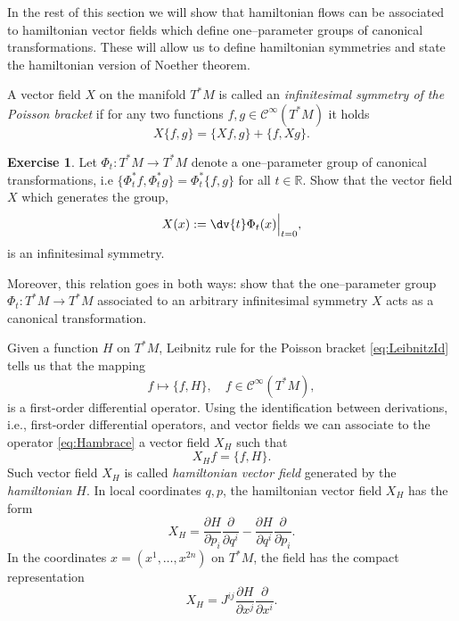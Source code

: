 \documentclass[english,fontsize=11pt,paper=b5]{scrbook}
\numberwithin{equation}{chapter}
\theoremstyle{definition}
\newtheorem{exercise}{Exercise}[chapter]
\begin{document}
    In the rest of this section we will show that hamiltonian flows can be associated to hamiltonian vector fields which define one--parameter groups of canonical transformations. These will allow us to define hamiltonian symmetries and state the hamiltonian version of Noether theorem.

    \begin{tcolorbox}
      A vector field $X$ on the manifold $T^* M$ is called an \emph{infinitesimal symmetry of the Poisson bracket} if for any two functions $f,g \in \mathcal{C}^\infty(T^*M)$ it holds
      \begin{equation}\label{eq:infsymm}
        X\big\{f,g\big\} = \big\{X f, g\big\} + \big\{f, X g\big\}.
      \end{equation}
    \end{tcolorbox}

    \begin{exercise}\label{exe:haminfsym}
      Let $\Phi_t:T^*M \to T^*M$ denote a one--parameter group of canonical transformations, i.e $\big\{\Phi_t^* f, \Phi_t^* g\big\} = \Phi_t^*\big\{f,g\big\}$ for all $t\in\mathbb{R}$.
      Show that the vector field $X$ which generates the group,
      \begin{equation}
        X(x) := \dv{t}\Phi_t(x)\Big|_{t=0},
      \end{equation}
      is an infinitesimal symmetry.

      Moreover, this relation goes in both ways: show that the one--parameter group $\Phi_t:T^*M \to T^*M$ associated to an  arbitrary infinitesimal symmetry $X$ acts as a canonical transformation.
    \end{exercise}

    Given a function $H$ on $T^* M$, Leibnitz rule for the Poisson bracket \eqref{eq:LeibnitzId} tells us that the mapping
    \begin{equation}\label{eq:Hambrace}
      f \mapsto \big\{f,H\big\}, \quad f\in\mathcal{C}^\infty(T^*M),
    \end{equation}
    is a first-order differential operator.
    Using the identification between derivations, i.e., first-order differential operators, and vector fields we can associate to the operator \eqref{eq:Hambrace} a vector field $X_H$ such that
    \begin{equation}
      X_H f = \big\{f, H\big\}.
    \end{equation}
    Such vector field $X_H$ is called \emph{hamiltonian vector field} generated by the \emph{hamiltonian} $H$.
    In local coordinates $q,p$, the hamiltonian vector field $X_H$ has the form
    \begin{equation}
      X_H = \frac{\partial H}{\partial p_i} \frac{\partial}{\partial q^i} - \frac{\partial H}{\partial q^i}\frac{\partial}{\partial p_i}.
    \end{equation}
    In the coordinates $x = (x^1, \ldots, x^{2n})$ on $T^*M$, the field has the compact representation
    \begin{equation}
      X_H = J^{ij}\frac{\partial H}{\partial x^j}\frac{\partial}{\partial x^i}.
    \end{equation}
\end{document}
